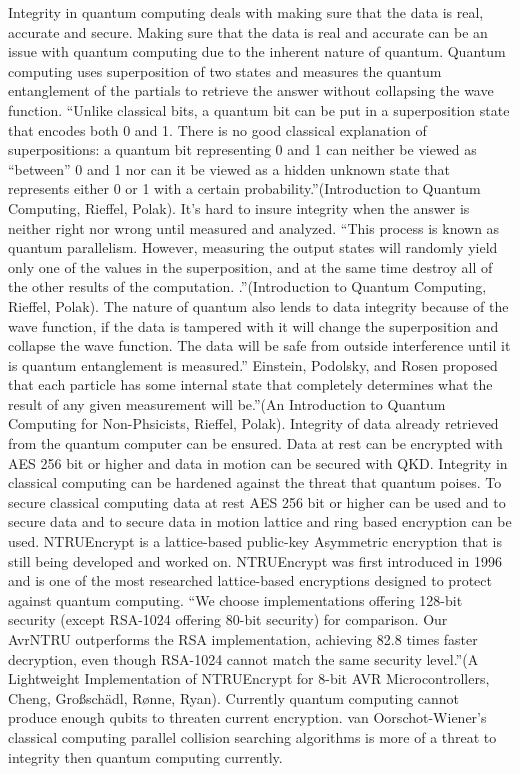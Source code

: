 \documentclass[sigconf]{acmart}
\begin{document}
Integrity in quantum computing deals with making sure that the data is real, accurate and secure. Making sure that the data is real and accurate can be an issue with quantum computing due to the inherent nature of quantum. Quantum computing uses superposition of two states and measures the quantum entanglement of the partials to retrieve the answer without collapsing the wave function. “Unlike classical bits, a quantum bit can be put in a superposition state that encodes both 0 and 1. There is no good classical explanation of superpositions: a quantum bit representing 0 and 1 can neither be viewed as “between” 0 and 1 nor can it be viewed as a hidden unknown state that represents either 0 or 1 with a certain probability.”(Introduction to Quantum Computing, Rieffel, Polak). It’s hard to insure integrity when the answer is neither right nor wrong until measured and analyzed. “This process is known as quantum parallelism. However, measuring the output states will randomly yield only one of the values in the superposition, and at the same time destroy all of the other results of the computation. .”(Introduction to Quantum Computing, Rieffel, Polak). The nature of quantum also lends to data integrity because of the wave function, if the data is tampered with it will change the superposition and collapse the wave function. The data will be safe from outside interference until it is quantum entanglement is measured.” Einstein, Podolsky, and Rosen proposed that each particle has some internal state that completely determines what the result of any given measurement will be.”(An Introduction to Quantum Computing for Non-Phsicists, Rieffel, Polak). Integrity of data already retrieved from the quantum computer can be ensured. Data at rest can be encrypted with AES 256 bit or higher and data in motion can be secured with QKD. Integrity in classical computing can be hardened against the threat that quantum poises. To secure classical computing data at rest AES 256 bit or higher can be used and to secure data and to secure data in motion lattice and ring based encryption can be used. NTRUEncrypt is a lattice-based public-key Asymmetric encryption that is still being developed and worked on. NTRUEncrypt was first introduced in 1996 and is one of the most researched lattice-based encryptions designed to protect against quantum computing. “We choose implementations offering 128-bit security (except RSA-1024 offering 80-bit security) for comparison. Our AvrNTRU outperforms the RSA implementation, achieving 82.8 times faster decryption, even though RSA-1024 cannot match the same security level.”(A Lightweight Implementation of NTRUEncrypt for 8-bit AVR Microcontrollers, Cheng, Großschädl, Rønne, Ryan). Currently quantum computing cannot produce enough qubits to threaten current encryption. van Oorschot-Wiener’s classical computing parallel collision searching algorithms is more of a threat to integrity then quantum computing currently.
\end{document}
